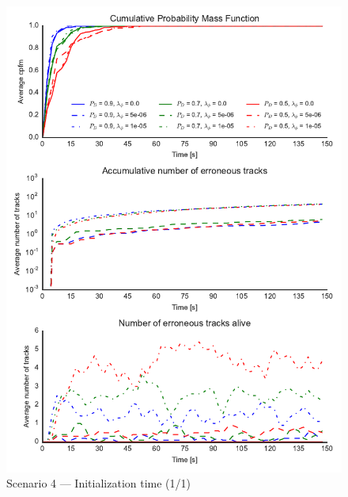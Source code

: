 
\begin{figure}
\centering
\includegraphics{Figures/plots/Scenario4_Init-Time(1-1).pdf}
\caption{Scenario 4 --- Initialization time (1/1)}\label{fig:init4_time_1-1}
\end{figure}

